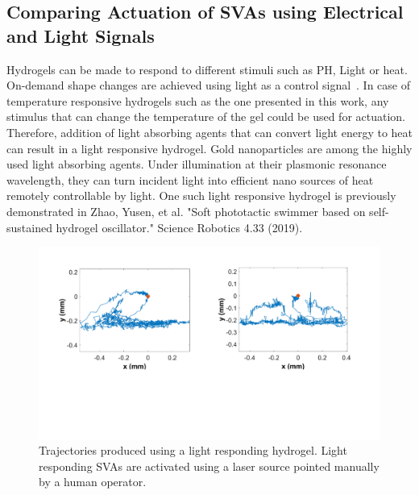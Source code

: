 \subsection{Comparing Actuation of SVAs using Electrical and Light Signals}
\label{subsec:elecVSlight}
Hydrogels can be made to respond to different stimuli such as PH, Light or heat. On-demand shape changes are achieved using light as a control signal~\cite{Wang2015b}. In case of temperature responsive hydrogels such as the one presented in this work, any stimulus that can change the temperature of the gel could be used for actuation. Therefore, addition of light absorbing agents that can convert light energy to heat can result in a light responsive hydrogel. Gold nanoparticles are among the highly used light absorbing agents. Under illumination at their plasmonic resonance wavelength, they can turn incident light into efficient nano sources of heat remotely controllable by light. One such light responsive hydrogel is previously demonstrated in {Zhao, Yusen, et al. "Soft phototactic swimmer based on self-sustained hydrogel oscillator." Science Robotics 4.33 (2019).}
\begin{figure}[!th]
      \centering
      \includegraphics[width=1\textwidth]{Fig4.pdf}
      \caption[Trajectories using a light responding hydrogel]{Trajectories produced using a light responding hydrogel. Light responding SVAs are activated using a laser source pointed manually by a human operator.}
      \label{fig:laser}
\end{figure}

